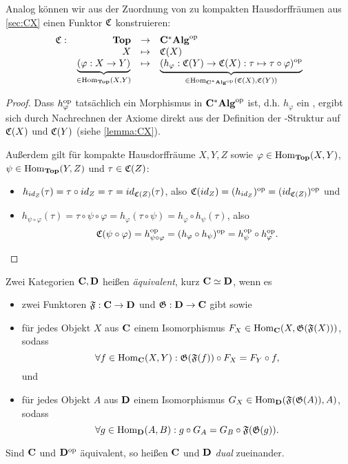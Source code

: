 \begin{bsp}\label{bsp:FunktorC}
Analog können wir aus der Zuordnung von \CAlgn{} zu kompakten Hausdorffräumen aus  \cref{sec:CX} einen Funktor $\mathfrak{C}$ konstruieren:
\[ \begin{array}{@{}rrcl@{}}
	\stetig: 	&\KatTop			&\to 		&\KatCAlg^\op													\\
				&X					&\mapsto 	&\stetig(X)													\\				
				&\underbrace{(\varphi:X \to Y)}_{\in \Hom_{\KatTop}(X,Y)} 	&\mapsto	
				&\underbrace{(h_\varphi: \stetig(Y) \to \stetig(X): \tau \mapsto \tau \circ \varphi)^\op}_{\in \Hom_{\KatCAlg^\op}(\stetig(X),\stetig(Y))}
\end{array} \]
\end{bsp}

\begin{proof}Dass $h_\varphi^{\mathrm{op}}$ tatsächlich ein Morphismus in $\mathbf{C^*Alg}^{\mathrm{op}}$ ist, d.h. $h_\varphi$ ein \CAlgHom{}, ergibt sich durch Nachrechnen der Axiome direkt aus der Definition der \CAlg-Struktur auf $\mathfrak{C}(X)$ und $\mathfrak{C}(Y)$ (siehe \cref{lemma:CX}).

Außerdem gilt für kompakte Hausdorffräume $X, Y, Z$ sowie $\varphi \in \mathrm{Hom}_{\mathbf{Top}}(X,Y)$, $\psi \in \mathrm{Hom}_{\mathbf{Top}}(Y,Z)$ und $\tau \in \mathfrak{C}(Z)$:
\begin{itemize}
	\item $h_{id_Z}(\tau) = \tau \circ id_Z = \tau = id_{\mathfrak{C}(Z)}(\tau)$, also $\mathfrak{C}(id_Z) = (h_{id_Z})^{\mathrm{op}} = (id_{\mathfrak{C}(Z)})^{\mathrm{op}}$ und
	\item $h_{\psi\circ \varphi}(\tau) = \tau\circ \psi \circ \varphi = h_\varphi(\tau\circ\psi) = h_\varphi \circ h_\psi(\tau)$, also 
		\[\mathfrak{C}(\psi \circ \varphi) = h_{\psi \circ \varphi}^{\mathrm{op}} = (h_\varphi \circ h_\psi)^{\mathrm{op}} = h_\psi^{\mathrm{op}} \circ h_\varphi^{\mathrm{op}}.\]
\end{itemize}
\end{proof}

\begin{defn}[Kategorienäquivalenz]\label{defn:KatAEquiv}
Zwei Kategorien $\mathbf{C}, \mathbf{D}$ heißen \emph{äquivalent}, kurz $\mathbf{C} \simeq \mathbf{D}$, wenn es 
\begin{itemize}
	\item zwei Funktoren $\mathfrak{F}: \mathbf{C} \to \mathbf{D}$ und $\mathfrak{G}:\mathbf{D} \to \mathbf{C}$ gibt sowie
	\item für jedes Objekt $X$ aus $\mathbf{C}$ einem Isomorphismus $F_X \in \mathrm{Hom}_{\mathbf{C}}(X, \mathfrak{G}(\mathfrak{F}(X)))$, sodass
		\[\forall f \in \mathrm{Hom}_{\mathbf{C}}(X,Y): \mathfrak{G}(\mathfrak{F}(f))\circ F_X = F_Y \circ f,\]
	 und
	\item für jedes Objekt $A$ aus $\mathbf{D}$ einem Isomorphismus $G_X \in \mathrm{Hom}_{\mathbf{D}}(\mathfrak{F}(\mathfrak{G}(A)), A)$, sodass	
		\[\forall g \in \mathrm{Hom}_{\mathbf{D}}(A,B): g\circ G_A = G_B \circ \mathfrak{F}(\mathfrak{G}(g)).\]
\end{itemize}

Sind $\mathbf{C}$ und $\mathbf{D}^{\mathrm{op}}$ äquivalent, so heißen $\mathbf{C}$ und $\mathbf{D}$ \emph{dual} zueinander.
\end{defn}

